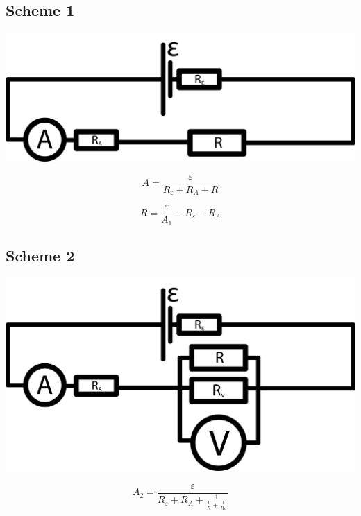 \documentclass[11pt]{memoir}
\begin{document}
    \begin{center}
    \subsection{Scheme 1}\label{subsec:scheme-1}
        \includegraphics[width=\linewidth]{../schemes/Scheme1.png}

            \begin{equation*}
                A = \frac{\varepsilon}{R_\varepsilon + R_A + R}
            \end{equation*}

            \begin{equation}\label{eq:equation1}
                R = \frac{\varepsilon}{A_1} - R_\varepsilon - R_A
            \end{equation}
    \end{center}


    \newpage

    \subsection{Scheme 2}\label{subsec:scheme-2}

    \includegraphics[width=\linewidth]{../schemes/Scheme2.png}

    \begin{equation*}
        A_2 = \frac{\varepsilon}{R_\varepsilon + R_A + \frac{1}{\frac{1}{R} + \frac{1}{R_V}}}
    \end{equation*}
\end{document}
